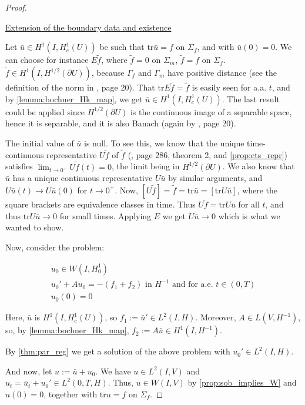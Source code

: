 \documentclass[english,a4paper,12pt,oneside]{scrbook}
\theoremstyle{break}
\newenvironment{mproof}[1][\proofname]{%
  \begin{proof}[#1]$ $\par\nobreak\ignorespaces
}{%
  \end{proof}
}
\renewcommand*{\proofname}{Proof}
\theoremstyle{remark}
\newcommand{\tr}{\text{tr}}
\begin{document}
\begin{mproof}

\underline{Extension of the boundary data and existence}

Let $\bar{u}\in H^1(I,H^1_c(U))$ be such that $\tr \bar{u} =f$ on $\Sigma_f$, and with $\bar{u}(0)=0$. We can choose for instance $E\tilde{f}$, where $\tilde{f}=0$ on $\Sigma_m$, $\tilde{f}=f$ on $\Sigma_f$. $\tilde{f} \in H^1(I,H^{1/2}(\partial U))$, because $\Gamma_f$ and $\Gamma_m$ have positive distance (see the definition of the norm in \cite{grisvard}, page 20).  That $\tr E \tilde{f}=\tilde{f}$ is easily seen for a.a. $t$, and by \cref{lemma:bochner_Hk_map}, we get $\bar{u} \in H^1(I,H^1_c(U))$. The last result could be applied since $H^{1/2}(\partial U)$ is the continuous image of a separable space, hence it is separable, and it is also Banach (again by \cite{grisvard}, page 20).


The initial value of $\bar{u}$ is null. To see this, we know that the unique time-continuous representative $U\tilde{f}$ of $\tilde{f}$ (\cite{evans}, page 286, theorem 2, and \cref{prop:cts_repr}) satisfies $\lim_{t\rightarrow 0^+}U\tilde{f}(t)=0$, the limit being in $H^{1/2}(\partial U)$. We also know that $\bar{u}$ has a unique continuous representative $U\bar{u}$ by similar arguments, and $U\bar{u}(t) \rightarrow U\bar{u}(0)$ for $t\rightarrow 0^+$. Now, $ [U\tilde{f}] = \tilde{f} = \tr \bar{u} =[ \tr U\bar{u} ]$, where the square brackets are equivalence classes in time. Thus $U\tilde{f} =  \tr U\bar{u}$ for all $t$, and thus $\tr U\bar{u}\rightarrow 0$ for small times. Applying $E$ we get $U\bar{u}\rightarrow 0$ which is what we wanted to show.

Now, consider the problem: 

\begin{align}
u_0 \in W(I,H^1_0) \\
u_0' + A u_0 = -(f_1+f_2) \text{ in }H^{-1} \text{ and for a.e. } t \in (0,T) \\
u_0(0)=0
\end{align}

Here, $\bar{u}$ is $H^1(I,H^1_c(U))$, so $f_1:=\bar{u}' \in L^2(I,H)$. Moreover, $A \in L(V, H^{-1})$, so, by \cref{lemma:bochner_Hk_map}, $f_2:=A\bar{u} \in H^1(I, H^{-1})$.

By \cref{thm:par_reg} we get a solution of the above problem with $u_0' \in L^2(I, H)$. 

And now, let $u:=\bar{u}+u_0$. We have $u \in L^2(I, V)$ and $u_t=\bar{u}_t + u_0' \in L^2(0,T,H)$. Thus, $u \in W(I,V)$ by \cref{prop:sob_implies_W} and $u(0)=0$, together with $\tr u = f$ on $\Sigma_f$. 


\end{mproof}
\end{document}
